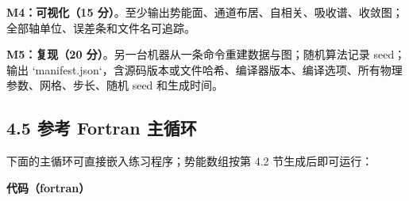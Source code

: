 \documentclass[UTF8,openany,11pt,fontset=fandol]{ctexbook}
\begin{document}
\textbf{M4：可视化（15
分）}。至少输出势能面、通道布居、自相关、吸收谱、收敛图；全部轴单位、误差条和文件名可追踪。

\textbf{M5：复现（20
分）}。另一台机器从一条命令重建数据与图；随机算法记录 seed；输出
`manifest.json`，含源码版本或文件哈希、编译器版本、编译选项、所有物理参数、网格、步长、随机
seed 和生成时间。

\subsection{\texorpdfstring{\textbf{4.5 参考 Fortran
主循环}}{4.5 参考 Fortran 主循环}}\label{ux53c2ux8003-fortran-ux4e3bux5faaux73af}

下面的主循环可直接嵌入练习程序；势能数组按第 4.2 节生成后即可运行：

\textbf{代码（fortran）}
\end{document}

